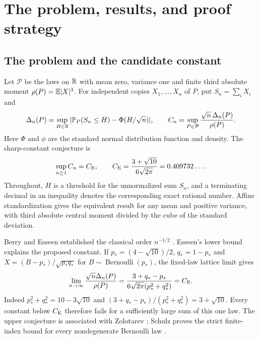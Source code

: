 \section{The problem, results, and proof strategy}\label{ms:introduction}
\subsection{The problem and the candidate constant}
Let $\mathcal P$ be the laws on $\mathbb R$ with mean zero, variance one and
finite third absolute moment $\rho(P)=\mathbb E|X|^3$. For independent copies
$X_1,\ldots,X_n$ of $P$, put $S_n=\sum_iX_i$ and
\[
 \Delta_n(P)=\sup_{H\in\mathbb R}|\mathbb P_P(S_n\le H)-\Phi(H/\sqrt n)|,
 \qquad C_n=\sup_{P\in\mathcal P}\frac{\sqrt n\,\Delta_n(P)}{\rho(P)}.
\]
Here $\Phi$ and $\phi$ are the standard normal distribution function
and density. The sharp-constant conjecture is
\begin{equation}\label{ms:conjecture}
 \sup_{n\ge1}C_n=C_{\mathrm E},
 \qquad C_{\mathrm E}=\frac{3+\sqrt{10}}{6\sqrt{2\pi}}=0.409732\ldots.
\end{equation}
Throughout, $H$ is a threshold for the unnormalized sum $S_n$, and
a terminating decimal in an inequality denotes the corresponding exact
rational number. Affine standardization gives the equivalent result
for any mean and positive variance, with third absolute central moment
divided by the cube of the standard deviation.

Berry and Esseen established the classical order $n^{-1/2}$
\cite{Berry1941,Esseen1942,Esseen1945}. Esseen's lower bound
\cite{Esseen1956} explains the proposed constant. If
$p_*=(4-\sqrt{10})/2$, $q_*=1-p_*$ and
$X=(B-p_*)/\sqrt{p_*q_*}$ for $B\sim\operatorname{Bernoulli}(p_*)$,
the fixed-law lattice limit gives
\begin{equation}\label{ms:bernoulli-limit}
 \lim_{n\to\infty}\frac{\sqrt n\Delta_n(P)}{\rho(P)}
 =\frac{3+q_*-p_*}{6\sqrt{2\pi}(p_*^2+q_*^2)}=C_{\mathrm E}.
\end{equation}
Indeed $p_*^2+q_*^2=10-3\sqrt{10}$ and
$(3+q_*-p_*)/(p_*^2+q_*^2)=3+\sqrt{10}$.
Every constant below $C_{\mathrm E}$ therefore fails for a sufficiently large sum
of this one law. The upper conjecture is associated with Zolotarev
\cite{Zolotarev1966,Zolotarev1967}; Schulz proves the strict finite-index
bound for every nondegenerate Bernoulli law \cite{Schulz2016}.


